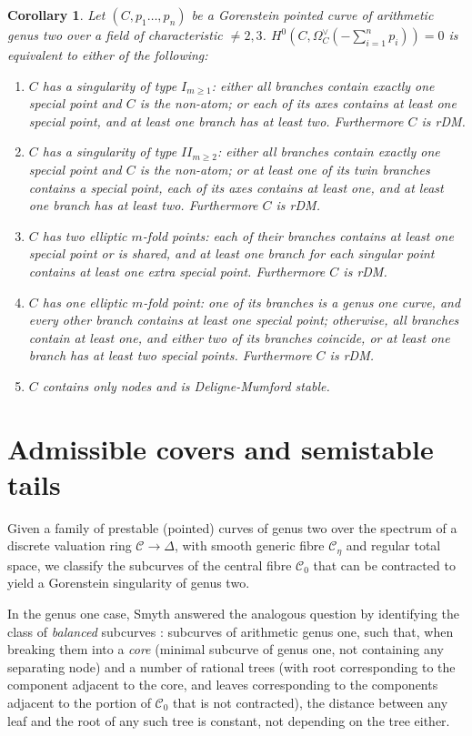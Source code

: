 \documentclass{compositio}
\renewcommand{\to}{\rightarrow}
\newcommand{\dvr}{\Delta}
\theoremstyle{plain}
\newtheorem{cor}[thm]{Corollary}
\theoremstyle{definition}
\theoremstyle{remark}
\begin{document}
\begin{cor}\label{cor:explicitnoaut}
 Let $(C,p_1\ldots,p_n)$ be a Gorenstein pointed curve of arithmetic genus two over a field of characteristic $\neq2,3$. $H^0(C,\Omega_C^\vee(-\sum_{i=1}^n p_i))=0$ is equivalent to either of the following:
 \begin{enumerate}[leftmargin=.6cm]
  \item $C$ has a singularity of type $I_{m\geq 1}$: either all branches contain exactly one special point and $C$ is the non-atom; or each of its axes contains at least one special point, and at least one branch has at least two. Furthermore $C$ is rDM.
  \item $C$ has a singularity of type $I\!I_{m\geq 2}$: either all branches contain exactly one special point and $C$ is the non-atom; or at least one of its twin branches contains a special point, each of its axes contains at least one, and at least one branch has at least two. Furthermore $C$ is rDM.
  \item $C$ has two elliptic $m$-fold points: each of their branches contains at least one special point or is shared, and at least one branch for each singular point contains at least one extra special point. Furthermore $C$ is rDM.
  \item $C$ has one elliptic $m$-fold point: one of its branches is a genus one curve, and every other branch contains at least one special point; otherwise, all branches contain at least one, and either two of its branches coincide, or at least one branch has at least two special points. Furthermore $C$ is rDM.
  \item $C$ contains only nodes and is Deligne-Mumford stable.
 \end{enumerate}
\end{cor}

\section{Admissible covers and semistable tails}\label{sec:sstails}

Given a family of prestable (pointed) curves of genus two over the spectrum of a discrete valuation ring $\mathcal C\to\dvr$, with smooth generic fibre $\mathcal C_{\eta}$ and regular total space, we classify the subcurves of the central fibre $\mathcal C_{0}$ that can be contracted to yield a Gorenstein singularity of genus two. 

In the genus one case, Smyth answered the analogous question by identifying the class of \emph{balanced} subcurves \cite[Definition 2.11]{SMY1}: subcurves of arithmetic genus one, such that, when breaking them into a \emph{core} (minimal subcurve of genus one, not containing any separating node) and a number of rational trees (with root corresponding to the component adjacent to the core, and leaves corresponding to the components adjacent to the portion of $\mathcal C_0$ that is not contracted), the distance between any leaf and the root of any such tree is constant, not depending on the tree either.
\end{document}
